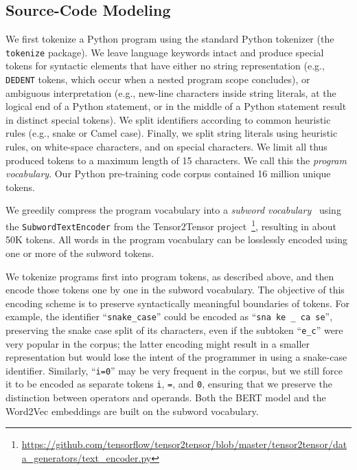 \documentclass{article}
\newcommand{\update}[1]{#1}
\begin{document}
\subsection{Source-Code Modeling}
\label{sec:source-code-modeling}

We first tokenize a Python program using the standard Python tokenizer (the \texttt{tokenize} package). We leave language keywords intact and produce special tokens for syntactic elements that have either no string representation (e.g., \texttt{DEDENT} tokens, which occur when a nested program scope concludes), or ambiguous interpretation (e.g., new-line characters inside string literals, at the logical end of a Python statement, or in the middle of a Python statement result in distinct special tokens). We split identifiers according to common heuristic rules (e.g., snake or Camel case). Finally, we split string literals using heuristic rules, on white-space characters, and on special characters. \update{We limit all thus produced tokens to a maximum length of 15 characters.} We call this the \emph{program vocabulary}.
Our Python pre-training code corpus contained \update{\num{16} million unique tokens}.

We greedily compress the program vocabulary into a \emph{subword vocabulary}~\citep{37842} using the \texttt{SubwordTextEncoder} from the Tensor2Tensor project~\citep{DBLP:conf/amta/VaswaniBBCGGJKK18}\footnote{\url{https://github.com/tensorflow/tensor2tensor/blob/master/tensor2tensor/data_generators/text_encoder.py}}, resulting in \update{about 50K tokens}. All words in the program vocabulary can be losslessly encoded using one or more of the subword tokens.

We tokenize programs first into program tokens, as described above, and then encode those tokens one by one in the subword vocabulary. The objective of this encoding scheme is to preserve syntactically meaningful boundaries of tokens. For example, the identifier ``\texttt{snake\_case}'' could be encoded as \mbox{``\texttt{sna ke \_ ca se}''}, preserving the snake case split of its characters, even if the subtoken ``\texttt{e\_c}'' were very popular in the corpus; the latter encoding might result in a smaller representation but would lose the intent of the programmer in using a snake-case identifier. Similarly, ``\texttt{i=0}'' may be very frequent in the corpus, but we still force it to be encoded as separate tokens \texttt{i}, \texttt{=}, and \texttt{0}, ensuring that we preserve the distinction between operators and operands. Both the BERT model and the Word2Vec embeddings are built on the subword vocabulary.
\end{document}
